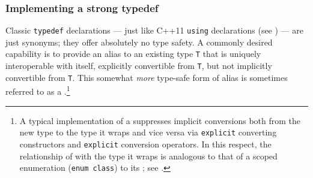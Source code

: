 \subsubsection[Implementing a strong \lstinline!typedef!]{Implementing a strong {\SubsubsecCode typedef}}\label{implementing-a-strong-typedef}

Classic \lstinline!typedef! declarations --- just like C++11
\lstinline!using! declarations (see ) 
--- are just synonyms; they
offer absolutely no type safety. A commonly desired capability is to
provide an alias to an existing type \lstinline!T! that is uniquely
interoperable with itself, explicitly convertible from \lstinline!T!, but
not implicitly convertible from \lstinline!T!. This somewhat \emph{more}
type-safe form of alias is sometimes referred to as a .{\cprotect\footnote{A typical implementation of a  suppresses implicit conversions both from the new type to the type it wraps and vice versa via \lstinline!explicit! converting constructors and \lstinline!explicit! conversion operators.  In this respect, the relationship of  with the type it wraps is analogous to that of a scoped enumeration (\lstinline!enum!~\lstinline!class!)  to its ; see .}}

